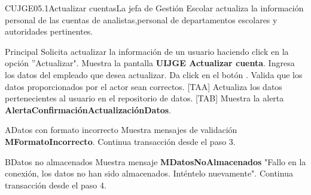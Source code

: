 \begin{UseCase}{CUJGE05.1}{Actualizar cuentas}{La jefa de Gestión Escolar actualiza la información personal de las cuentas de analistas,personal de departamentos escolares y autoridades pertinentes.}
{\begin{itemize}
    \end{itemize}
  }
\end{UseCase}

\begin{UCtrayectoria}{Principal}
  \UCpaso[\UCactor] Solicita actualizar la información de un usuario haciendo click en la opción ''Actualizar".
  \UCpaso Muestra la pantalla {\bf UIJGE Actualizar cuenta}.
  \UCpaso[\UCactor] Ingresa los datos del empleado que desea actualizar.
  \UCpaso[\UCactor] Da click en el botón .
  \UCpaso Valida que los datos proporcionados por el actor sean correctos. [TAA]
  \UCpaso Actualiza los datos pertenecientes al usuario en el repositorio de datos. [TAB]
  \UCpaso Muestra la alerta  {\bf AlertaConfirmaciónActualizaciónDatos}.
\end{UCtrayectoria}

\begin{UCtrayectoriaA}{A}{Datos con formato incorrecto} 
  \UCpaso Muestra mensajes de validación {\bf MFormatoIncorrecto}.
  \UCpaso Continua transacción desde el paso 3.
\end{UCtrayectoriaA}

\begin{UCtrayectoriaA}{B}{Datos no almacenados} 
  \UCpaso Muestra mensaje {\bf MDatosNoAlmacenados} "Fallo en la conexión, los datos no han sido almacenados. Inténtelo nuevamente".
  \UCpaso Continua transacción desde el paso 4.
\end{UCtrayectoriaA}



